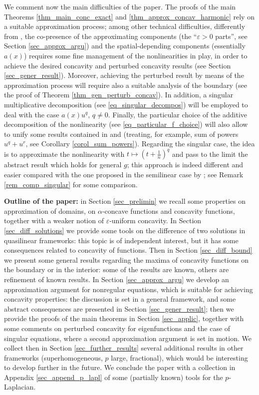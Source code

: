 \documentclass[11pt, reqno]{amsart}
\theoremstyle{definition}
\numberwithin{equation}{section}
\def\eps{\varepsilon}
\begin{document}
We comment now the main difficulties of the paper.
The proofs of the main Theorems \ref{thm_main_conc_exact} and \ref{thm_approx_concav_harmonic} rely on a suitable approximation process; among other technical difficulties, differently from \cite{Ken85, Sak87, BMS22, BuSq20}, the co-presence of the approximating components (the ``$\eps>0$ parts'', see Section \ref{sec_approx_argu}) and the spatial-depending components (essentially $a(x)$) requires some fine management of the nonlinearities in play, in order to achieve the desired concavity and perturbed concavity results (see Section \ref{sec_gener_result}). 
Moreover, achieving the perturbed result by means of the approximation process will require also a suitable analysis of the boundary (see the proof of Theorem \ref{thm_gen_perturb_concav}).
In addition, a singular multiplicative decomposition (see \eqref{eq_singular_decompos}) will be employed to deal with the case $a(x) u^q$, $q \neq 0$. 
Finally, the particular choice of the additive decomposition of the nonlinearity (see \eqref{eq_particular_f_choice}) will also allow to unify some results contained in \cite{Ken85} and \cite{BMS22} (treating, for example, sum of powers $u^q+u^r$, see Corollary \ref{corol_sum_powers}). 
Regarding the singular case, the idea is to approximate the nonlinearity with $t \mapsto (t+\frac{1}{n})^q$ and pass to the limit the abstract result which holds for general $g$; this approach is indeed different and easier compared with the one proposed in the semilinear case by \cite{BGP99}; see Remark \ref{rem_comp_singular} for some comparison.

\medskip

\textbf{Outline of the paper:} 
in Section \ref{sec_prelimin} we recall some properties on approximation of domains, on $\alpha$-concave functions and concavity functions, together with a weaker notion of $\eps$-uniform concavity. 
In Section \ref{sec_diff_solutions} we provide some tools on the difference of two solutions in quasilinear frameworks: this topic is of independent interest, but it has some consequences related to concavity of functions. 
Then in Section \ref{sec_diff_bound} we present some general results regarding the maxima of concavity functions on the boundary or in the interior: some of the results are known, others are refinement of known results.
In Section \ref{sec_approx_argu} we develop an approximation argument for nonregular equations, which is suitable for achieving concavity properties: the discussion is set in a general framework, and some abstract consequences are presented in Section \ref{sec_gener_result}; then we provide the proofs of the main theorems in Section \ref{sec_applic}, together with some comments on perturbed concavity for eigenfunctions and the case of singular equations, where a second approximation argument is set in motion.
We collect then in Section \ref{sec_further_results} several additional results in other frameworks (superhomogeneous, $p$ large, fractional), which would be interesting to develop further in the future. 
We conclude the paper with a collection in Appendix \ref{sec_append_p_lapl} of some (partially known) tools for the $p$-Laplacian.
\end{document}
